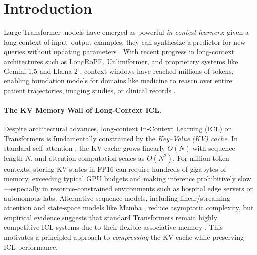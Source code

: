 \documentclass{article}
\theoremstyle{plain}
\theoremstyle{definition}
\theoremstyle{remark}
\begin{document}
\section{Introduction}
\label{sec:intro}

Large Transformer models have emerged as powerful \emph{in-context learners}: given a long context of input--output examples, they can synthesize a predictor for new queries without updating parameters \citep{brown2020language,garg2022what}. With recent progress in long-context architectures such as LongRoPE, Unlimiformer, and proprietary systems like Gemini 1.5 and Llama 2 \citep{ding2024longrope,bertsch2024unlimiformer,team2024gemini,touvron2023llama}, context windows have reached millions of tokens, enabling foundation models for domains like medicine to reason over entire patient trajectories, imaging studies, or clinical records \citep{moor2023foundation}.

\paragraph{The KV Memory Wall of Long-Context ICL.}
Despite architectural advances, long-context In-Context Learning (ICL) on Transformers is fundamentally constrained by the \emph{Key--Value (KV) cache}. In standard self-attention \citep{vaswani2017attention}, the KV cache grows linearly $O(N)$ with sequence length $N$, and attention computation scales as $O(N^2)$. For million-token contexts, storing KV states in FP16 can require hundreds of gigabytes of memory, exceeding typical GPU budgets and making inference prohibitively slow—especially in resource-constrained environments such as hospital edge servers or autonomous labs. Alternative sequence models, including linear/streaming attention \citep{katharopoulos2020transformers} and state-space models like Mamba \citep{gu2024mamba}, reduce asymptotic complexity, but empirical evidence suggests that standard Transformers remain highly competitive ICL systems due to their flexible associative memory \citep{bietti2024birth}. This motivates a principled approach to \emph{compressing} the KV cache while preserving ICL performance.
\end{document}
